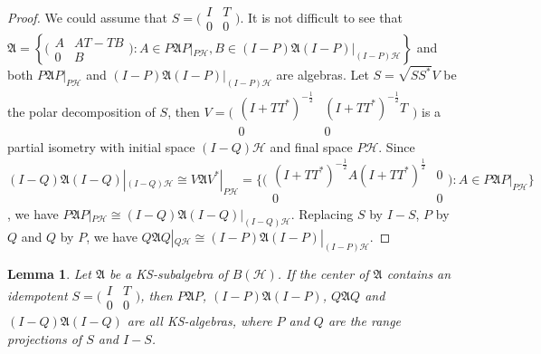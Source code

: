 \documentclass[a4paper,10pt]{amsart}
\newtheorem{lemma}{Lemma}[section]
\theoremstyle{refs}
\newcommand{\AAA}{\mathfrak A}
\newcommand{\HHH}{\mathcal H} %
\begin{document}
\begin{proof}
We could assume that $S =
\bigl(\begin{smallmatrix}
           I & T \\
           0 & 0
           \end{smallmatrix} \bigr)$.
It is not difficult to see that $\AAA =
\left \{
\bigl(\begin{smallmatrix}
           A & AT-TB\\
           0 & B
           \end{smallmatrix} \bigr)
: A \in P\AAA P|_{P\HHH}, B \in (I-P) \AAA (I-P) |_{(I-P)\HHH}
\right \}$ and both $P\AAA P|_{P\HHH}$ and $(I-P) \AAA (I-P) |_{(I-P)\HHH}$
are algebras.
Let $S = \sqrt{SS^{*}}V$ be the polar decomposition of $S$, then $V =
\bigl(\begin{smallmatrix}
           (I+TT^{*})^{-\frac{1}{2}} & (I+TT^{*})^{-\frac{1}{2}}T\\
           0 & 0
           \end{smallmatrix} \bigr)$ is a
partial isometry with initial space $(I-Q)\HHH$ and final space $P\HHH$.
Since $(I-Q) \AAA (I-Q) |_{(I-Q)\HHH} \cong V\AAA V^{*}|_{P\HHH} =\{
\bigl(\begin{smallmatrix}
 (I+TT^{*})^{-\frac{1}{2}}A(I+TT^{*})^{\frac{1}{2}} & 0\\
 0 & 0
\end{smallmatrix} \bigr) : A \in P \AAA P |_{P\HHH}\}$,
we have $P\AAA P |_{P\HHH} \cong (I-Q)\AAA (I-Q) |_{(I-Q)\HHH}$. Replacing $S$
by $I-S$, $P$ by $Q$ and $Q$ by $P$, we
have $Q\AAA Q |_{Q\HHH} \cong (I-P)\AAA
(I-P) |_{(I-P)\HHH}$.
\end{proof}

\begin{lemma} \label{lma7}
Let $\AAA$ be a KS-subalgebra of $B(\HHH)$.
If the center of $\AAA$ contains an idempotent $S =
\bigl(\begin{smallmatrix}
           I & T\\
           0 & 0
           \end{smallmatrix} \bigr)$, then $P \AAA P$,
$(I-P)\AAA (I-P)$, $Q \AAA Q$ and $(I-Q)\AAA (I-Q)$ are
all KS-algebras, where $P$ and $Q$ are the range projections of $S$ and $I-S$.
\end{lemma}
\end{document}
